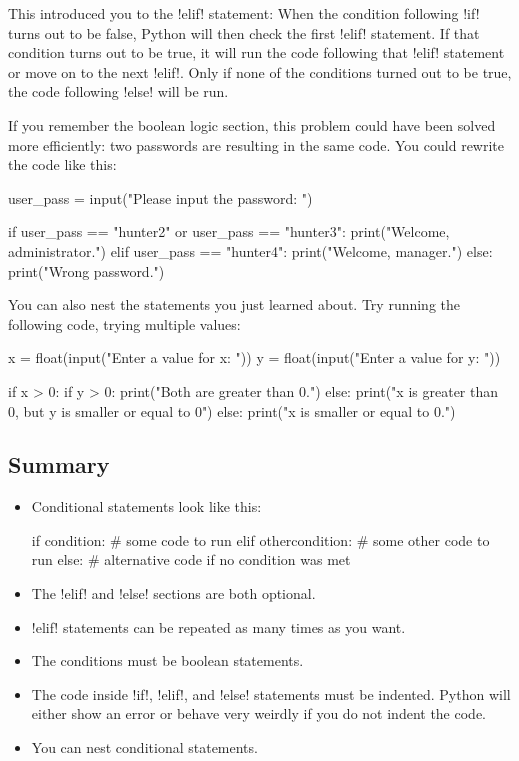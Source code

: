 \documentclass[11pt]{cselabheader}
\begin{document}
This introduced you to the \pythoninline!elif! statement: When the condition
following \pythoninline!if! turns out to be false, Python will then check the first
\pythoninline!elif! statement. If that condition turns out to be true, it will run
the code following that \pythoninline!elif! statement or move on to the next
\pythoninline!elif!. Only if none of the conditions turned out to be true, the code
following \pythoninline!else! will be run.

If you remember the boolean logic section, this problem could have been solved
more efficiently: two passwords are resulting in the same code. You could
rewrite the code like this:

\begin{python3code}
user_pass = input("Please input the password: ")

if user_pass == "hunter2" or user_pass == "hunter3":
    print("Welcome, administrator.")
elif user_pass == "hunter4":
    print("Welcome, manager.")
else:
    print("Wrong password.")
\end{python3code}

You can also nest the statements you just learned about. Try running the
following code, trying multiple values:

\begin{python3code}
x = float(input("Enter a value for x: "))
y = float(input("Enter a value for y: "))

if x > 0:
    if y > 0:
        print("Both are greater than 0.")
    else:
        print("x is greater than 0, but y is smaller or equal to 0")
else:
    print("x is smaller or equal to 0.")
\end{python3code}

\pagebreak
\subsection{Summary}

\begin{itemize}
  \item Conditional statements look like this:

    \begin{python3code}
if condition:
    # some code to run
elif othercondition:
    # some other code to run
else:
    # alternative code if no condition was met
    \end{python3code}

  \item The \pythoninline!elif! and \pythoninline!else! sections are both
    optional.
  \item \pythoninline!elif! statements can be repeated as many times as you
    want.
  \item The conditions must be boolean statements.
  \item The code inside \pythoninline!if!, \pythoninline!elif!, and
    \pythoninline!else! statements must be indented. Python will either show an
    error or behave very weirdly if you do not indent the code.
  \item You can nest conditional statements.
\end{itemize}
\end{document}

